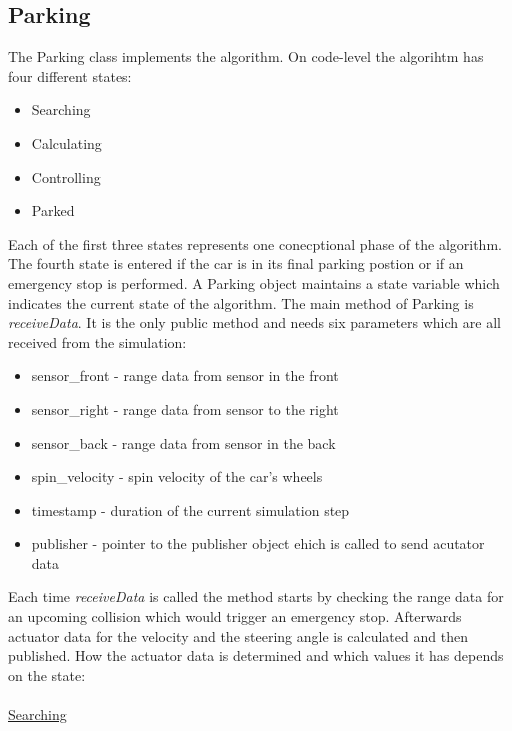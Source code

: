 \documentclass[paper=a4, fontsize=11pt]{scrreprt}
\begin{document}
\subsection{Parking} \label{parking}
The Parking class implements the algorithm. On code-level the algorihtm has four different states:
\begin{itemize}
	\item Searching
	\item Calculating
	\item Controlling
	\item Parked
\end{itemize}
Each of the first three states represents one conecptional phase of the algorithm. The fourth state is entered if the car is in its final parking postion or if an emergency stop is performed. A Parking object maintains a state variable which indicates the current state of the algorithm. The main method of Parking is \textit{receiveData}. It is the only public method and needs six parameters which are all received from the simulation:
\begin{itemize}
	\item sensor\_front - range data from sensor in the front
	\item sensor\_right - range data from sensor to the right
	\item sensor\_back - range data from sensor in the back
	\item spin\_velocity - spin velocity of the car's wheels
	\item timestamp - duration of the current simulation step 
	\item publisher - pointer to the publisher object ehich is called to send acutator data
\end{itemize}
Each time \textit{receiveData} is called the method starts by checking the range data for an upcoming collision which would trigger an emergency stop. Afterwards actuator data for the velocity and the steering angle is calculated and then published. How the actuator data is determined and which values it has depends on the state:\\
\\
\underline{Searching}\\
\end{document}
